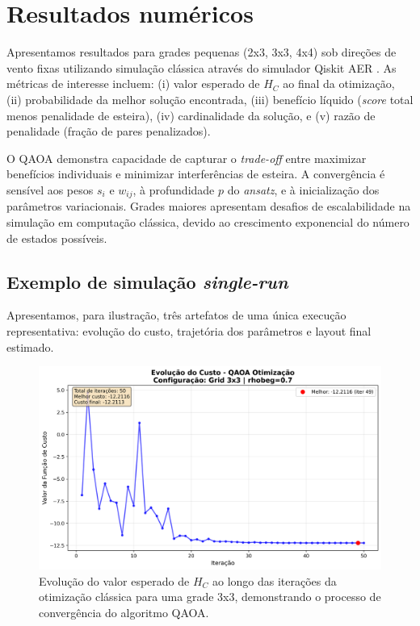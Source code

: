 \documentclass{weciq}
\begin{document}
\section{Resultados num\'ericos}
Apresentamos resultados para grades pequenas (2x3, 3x3, 4x4) sob direções de vento fixas utilizando simulação clássica através do simulador Qiskit AER \cite{QiskitCommunity2017}. As métricas de interesse incluem: (i) valor esperado de $H_C$ ao final da otimização, (ii) probabilidade da melhor solução encontrada, (iii) benefício líquido (\textit{score} total menos penalidade de esteira), (iv) cardinalidade da solução, e (v) razão de penalidade (fração de pares penalizados). 

O QAOA demonstra capacidade de capturar o \emph{trade-off} entre maximizar benefícios individuais e minimizar interferências de esteira. A convergência é sensível aos pesos $s_i$ e $w_{ij}$, à profundidade $p$ do \textit{ansatz}, e à inicialização dos parâmetros variacionais. Grades maiores apresentam desafios de escalabilidade na simulação em computação clássica, devido ao crescimento exponencial do número de estados possíveis.

\subsection*{Exemplo de simula\c{c}\~{a}o \textit{single-run}}
Apresentamos, para ilustração, três artefatos de uma única execução representativa: evolução do custo, trajetória dos parâmetros e layout final estimado.

\begin{figure}[htb]
\centering
\includegraphics[width=0.95\linewidth]{iteracoes.png}
\caption{Evolução do valor esperado de $H_C$ ao longo das iterações da otimização clássica para uma grade 3x3, demonstrando o processo de convergência do algoritmo QAOA.}
\end{figure}
\end{document}
